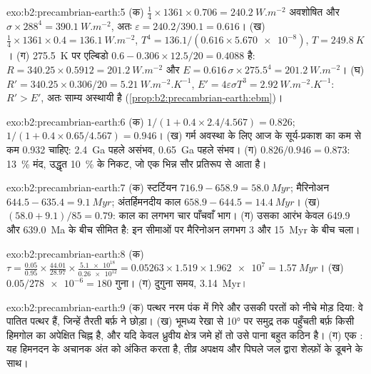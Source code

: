 \begin{solution}{exo:b2:precambrian-earth:5}
(क) $\tfrac14\times1361\times0.706 = \qty{240.2}{W.m^{-2}}$ अवशोषित और $\sigma\times288^4 =
\qty{390.1}{W.m^{-2}}$, अतः $\varepsilon = 240.2/390.1 = 0.616$। (ख) $\tfrac14\times1361\times0.4
= \qty{136.1}{W.m^{-2}}$, $T^4 = 136.1/(0.616\times\num{5.670e-8})$, $T = \qty{249.8}{K}$।
(ग) \qty{275.5}{K} पर एल्बिडो $0.6 - 0.306\times12.5/20 = 0.4088$ है: $R = 340.25\times0.5912 =
\qty{201.2}{W.m^{-2}}$ और $E = 0.616\,\sigma\times275.5^4 = \qty{201.2}{W.m^{-2}}$। (घ) $R' =
340.25\times0.306/20 = \qty{5.21}{W.m^{-2}.K^{-1}}$, $E' = 4\varepsilon\sigma T^3 =
\qty{2.92}{W.m^{-2}.K^{-1}}$: $R' > E'$, अतः साम्य अस्थायी है
(\cref{prop:b2:precambrian-earth:ebm})।
\end{solution}

\begin{solution}{exo:b2:precambrian-earth:6}
(क) $1/(1 + 0.4\times2.4/4.567) = 0.826$; $1/(1 + 0.4\times0.65/4.567) = 0.946$। (ख) गर्म
अवस्था के लिए आज के सूर्य-प्रकाश का कम से कम 0.932 चाहिए: \qty{2.4}{Ga} पहले असंभव,
\qty{0.65}{Ga} पहले संभव। (ग) $0.826/0.946 = 0.873$: \qty{13}{\percent} मंद, उद्धृत
\qty{10}{\percent} के निकट, जो एक भिन्न सौर प्रतिरूप से आता है।
\end{solution}

\begin{solution}{exo:b2:precambrian-earth:7}
(क) स्टर्टियन $716.9 - 658.9 = \qty{58.0}{Myr}$; मैरिनोअन $644.5 - 635.4 = \qty{9.1}{Myr}$;
अंतर्हिमनदीय काल $658.9 - 644.5 = \qty{14.4}{Myr}$। (ख) $(58.0 + 9.1)/85 = 0.79$: काल का लगभग चार
पाँचवाँ भाग। (ग) उसका आरंभ केवल 649.9 और \qty{639.0}{Ma} के बीच सीमित है: इन
सीमाओं पर मैरिनोअन लगभग 3 और \qty{15}{Myr} के बीच चला।
\end{solution}

\begin{solution}{exo:b2:precambrian-earth:8}
(क) $\tau = \frac{0.05}{0.95}\times\frac{44.01}{28.97}\times\frac{\num{5.1e18}}{\num{0.26e12}} =
0.05263\times1.519\times\num{1.962e7} = \qty{1.57}{Myr}$। (ख) $0.05/\num{278e-6} = 180$ गुना।
(ग) दुगुना समय, \qty{3.14}{Myr}।
\end{solution}

\begin{solution}{exo:b2:precambrian-earth:9}
(क) पत्थर नरम पंक में गिरे और उसकी परतों को नीचे मोड़ दिया: वे पातित पत्थर हैं, जिन्हें
तैरती बर्फ़ ने छोड़ा। (ख) भूमध्य रेखा से \ang{10} पर समुद्र तक पहुँचती बर्फ़ किसी
हिमगोल का अपेक्षित चिह्न है, और यदि केवल ध्रुवीय क्षेत्र जमे हों तो उसे पाना बहुत कठिन है। (ग) एक :
यह हिमनदन के अचानक अंत को अंकित करता है, तीव्र अपक्षय और पिघले जल द्वारा शेल्फ़ों के
डूबने के साथ।
\end{solution}

